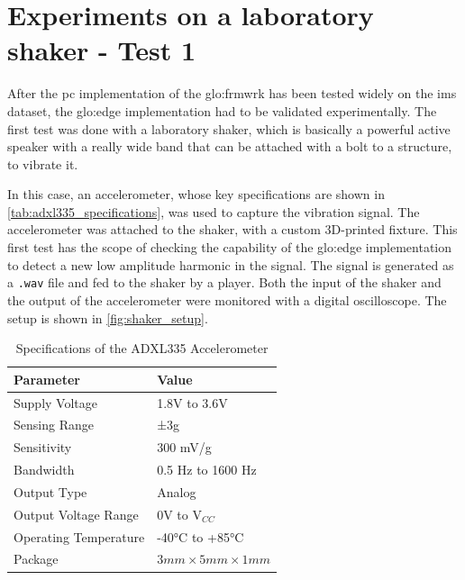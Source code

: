 \section{Experiments on a laboratory shaker - Test 1}
\label{sec:shaker_test01}

After the \gls{pc} implementation of the \gls{glo:frmwrk} has been tested widely on the \gls{ims} dataset, the \gls{glo:edge} implementation had to be validated experimentally. The first test was done with a laboratory shaker, which is basically a powerful active speaker with a really wide band that can be attached with a bolt to a structure, to vibrate it.

In this case, an accelerometer, whose key specifications are shown in \autoref{tab:adxl335_specifications}, was used to capture the vibration signal. The accelerometer was attached to the shaker, with a custom 3D-printed fixture. This first test has the scope of checking the capability of the \gls{glo:edge} implementation to detect a new low amplitude harmonic in the signal. The signal is generated as a \texttt{.wav} file and fed to the shaker by a player. Both the input of the shaker and the output of the accelerometer were monitored with a digital oscilloscope. The setup is shown in \autoref{fig:shaker_setup}.



\begin{table}[h]
    \centering
    \caption{Specifications of the ADXL335 Accelerometer}
    \label{tab:adxl335_specifications}
    \begin{tabular}{ll} 
    \toprule
    \textbf{Parameter} & \textbf{Value} \\ 
    \hline
    Supply Voltage & 1.8V to 3.6V \\
    Sensing Range & ±3g \\
    Sensitivity & 300 mV/g \\
    Bandwidth & 0.5 Hz to 1600 Hz \\
    Output Type & Analog \\
    Output Voltage Range & 0V to V$_{CC}$ \\
    Operating Temperature & -40°C to +85°C \\
    Package & $3\si{mm} \times 5 \si{mm} \times 1 \si{mm}$ \\
    \bottomrule
    \end{tabular}
\end{table}

